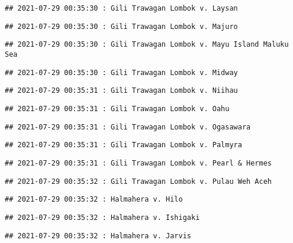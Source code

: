 \documentclass[
]{article}
\begin{document}
\begin{verbatim}
## 2021-07-29 00:35:30 : Gili Trawagan Lombok v. Laysan
\end{verbatim}

\begin{verbatim}
## 2021-07-29 00:35:30 : Gili Trawagan Lombok v. Majuro
\end{verbatim}

\begin{verbatim}
## 2021-07-29 00:35:30 : Gili Trawagan Lombok v. Mayu Island Maluku Sea
\end{verbatim}

\begin{verbatim}
## 2021-07-29 00:35:30 : Gili Trawagan Lombok v. Midway
\end{verbatim}

\begin{verbatim}
## 2021-07-29 00:35:31 : Gili Trawagan Lombok v. Niihau
\end{verbatim}

\begin{verbatim}
## 2021-07-29 00:35:31 : Gili Trawagan Lombok v. Oahu
\end{verbatim}

\begin{verbatim}
## 2021-07-29 00:35:31 : Gili Trawagan Lombok v. Ogasawara
\end{verbatim}

\begin{verbatim}
## 2021-07-29 00:35:31 : Gili Trawagan Lombok v. Palmyra
\end{verbatim}

\begin{verbatim}
## 2021-07-29 00:35:31 : Gili Trawagan Lombok v. Pearl & Hermes
\end{verbatim}

\begin{verbatim}
## 2021-07-29 00:35:32 : Gili Trawagan Lombok v. Pulau Weh Aceh
\end{verbatim}

\begin{verbatim}
## 2021-07-29 00:35:32 : Halmahera v. Hilo
\end{verbatim}

\begin{verbatim}
## 2021-07-29 00:35:32 : Halmahera v. Ishigaki
\end{verbatim}

\begin{verbatim}
## 2021-07-29 00:35:32 : Halmahera v. Jarvis
\end{verbatim}
\end{document}
